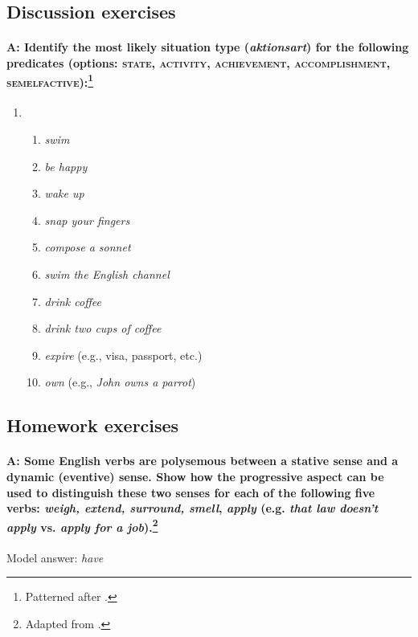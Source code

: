\subsection*{Discussion exercises}

\paragraph*{A: Identify the most likely situation type (\textit{aktionsart}) for the following predicates (options: \textsc{state, activity, achievement, accomplishment, semelfactive}):\footnote{Patterned after \citet[225]{Kearns2000}.}}

\begin{enumerate}
\item \begin{enumerate}
\item \itshape
swim
\item \itshape
be happy
\item \itshape
wake up
\item \itshape
snap your fingers
\item \itshape
compose a sonnet
\item \itshape
swim the English channel
\item \itshape
drink coffee
\item \itshape
drink two cups of coffee
\item \textit{expire} (e.g., visa, passport, etc.)
\item \textit{own} (e.g., \textit{John owns a parrot})
\end{enumerate}
\end{enumerate}
\subsection*{Homework exercises}

\paragraph*{A: Some English verbs are polysemous between a stative sense and a dynamic (eventive) sense. Show how the progressive aspect can be used to distinguish these two senses for each of the following five verbs: \textit{weigh, extend, surround, smell}, \textit{apply} (e.g. \textit{that law doesn’t apply} vs. \textit{apply for a job}).\footnote{Adapted from \citet[147]{Saeed2009}.}}


\textsf{Model answer:} \textsf{\textit{have}}

